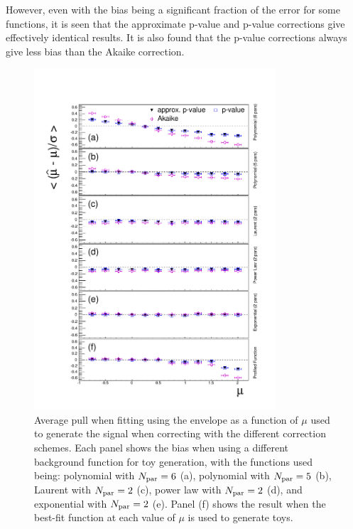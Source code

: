 However,
even with the bias being a significant fraction of the error for some functions,
it is seen that the approximate p-value and p-value corrections give
effectively identical results. It is also found 
that the p-value corrections always give less bias than the Akaike correction.
%
\begin{figure}[tbp]
\centering
\includegraphics[width=0.8\textwidth]{correction/AllOrderFunctions_call.pdf}
\caption{Average pull when fitting using the envelope as a function of $\mu$
used to generate the signal when correcting
with the different \nll correction schemes.
Each panel shows the bias when using
a different background function for toy generation, with the functions
used being: polynomial with $N_{\rm par}=6$ (a),
polynomial with $N_{\rm par}=5$ (b), Laurent with $N_{\rm par}=2$ (c),
power law with $N_{\rm par}=2$ (d), and exponential with $N_{\rm par}=2$ (e).
Panel (f) shows the result when the best-fit function at each
value of $\mu$ is used to generate toys.
}
\label{fig:correction:allorderbias}
\end{figure}

